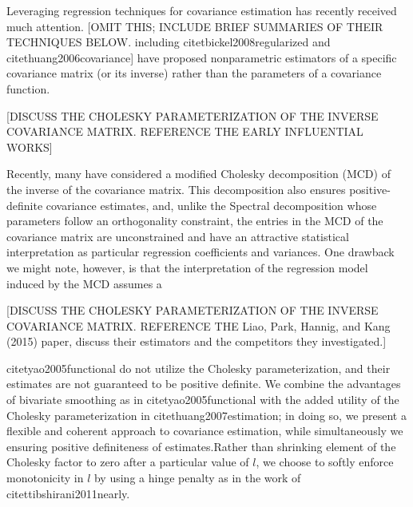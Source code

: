 \documentclass[12pt]{article}
\newcommand*\needsparaphrased{\color{red}}
\theoremstyle{definition}
\begin{document}
Leveraging regression techniques for covariance estimation has recently received much attention.  {\needsparaphrased [OMIT THIS; INCLUDE BRIEF SUMMARIES OF THEIR TECHNIQUES BELOW. including citet{bickel2008regularized} and citet{huang2006covariance}] } have proposed nonparametric estimators of a specific covariance matrix (or its inverse) rather than the parameters of a covariance function. 

{\needsparaphrased[DISCUSS THE CHOLESKY PARAMETERIZATION OF THE INVERSE COVARIANCE MATRIX. REFERENCE THE EARLY INFLUENTIAL WORKS]}

Recently, many have considered a modified Cholesky decomposition (MCD) of the inverse of the covariance matrix. This decomposition also ensures positive-definite covariance estimates, and, unlike the Spectral decomposition whose parameters follow an orthogonality constraint, the entries in the MCD of the covariance matrix are unconstrained and have an attractive statistical interpretation as particular regression coefficients and variances.  One drawback we might note, however, is that the interpretation of  the regression model induced by the MCD assumes a %

{\needsparaphrased[DISCUSS THE CHOLESKY PARAMETERIZATION OF THE INVERSE COVARIANCE MATRIX. REFERENCE THE Liao, Park, Hannig, and Kang (2015) paper, discuss their estimators and the competitors they investigated.]}



citet{yao2005functional} do not utilize the Cholesky parameterization, and their estimates are not guaranteed to be positive definite.  We combine the advantages of bivariate smoothing as in citet{yao2005functional} with the added utility of the Cholesky parameterization in citet{huang2007estimation}; in doing so, we present a flexible and coherent approach to covariance estimation, while simultaneously we ensuring positive definiteness of estimates.Rather than shrinking element of the Cholesky factor to zero after a particular value of $l$, we choose to softly enforce monotonicity in $l$ by using a hinge penalty as in the work of citet{tibshirani2011nearly}. 
\end{document}
